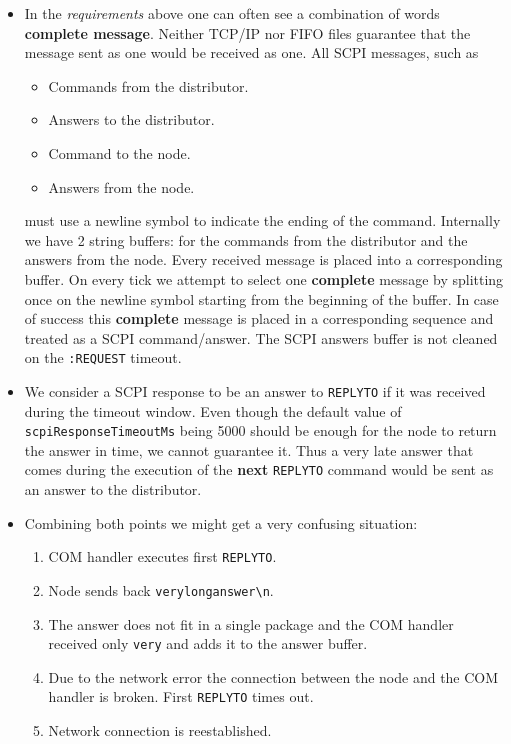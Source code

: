\begin{itemize}
	\item{
		In the \textit{requirements} above one can often see a combination of words \textbf{complete message}. Neither TCP/IP nor FIFO files guarantee that the message sent as one would be received as one. All SCPI messages, such as
		\begin{itemize}
			\item Commands from the distributor.
			\item Answers to the distributor.
			\item Command to the node.
			\item Answers from the node.
		\end{itemize}
		must use a newline  symbol to indicate the ending of the command. Internally we have 2 string buffers: for the commands from the distributor and the answers from the node. Every received message is placed into a corresponding buffer. On every tick we attempt to select one \textbf{complete} message by splitting once on the newline symbol  starting from the beginning of the buffer. In case of success this \textbf{complete} message is placed in a corresponding sequence and treated as a SCPI command/answer. The SCPI answers buffer is not cleaned on the \texttt{:REQUEST} timeout.
	}
	\item We consider a SCPI response to be an answer to \texttt{REPLYTO} if it was received during the timeout window. Even though the default value of \texttt{scpiResponseTimeoutMs} being 5000 should be enough for the node to return the answer in time, we cannot guarantee it. Thus a very late answer that comes during the execution of the \textbf{next} \texttt{REPLYTO} command would be sent as an answer to the distributor.
	\item{
		Combining both points we might get a very confusing situation:
		\begin{enumerate}
			\item COM handler executes first \texttt{REPLYTO}.
			\item Node sends back \texttt{verylonganswer\textbackslash n}.
			\item The answer does not fit in a single package and the COM handler received only \texttt{very} and adds it to the answer buffer.
			\item Due to the network error the connection between the node and the COM handler is broken. First \texttt{REPLYTO} times out.
			\item Network connection is reestablished.

\end{enumerate}}
\end{itemize}
